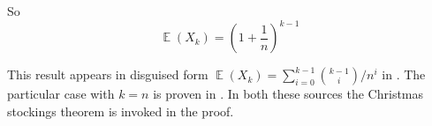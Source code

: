 \documentclass{article}
\DeclareMathOperator{\E}{\mathbb{E}}
\begin{document}
So 
\[
\E(X_k) = \left( 1 + \frac{1}{n} \right)^{k-1}
\]


This result appears in disguised form $\E(X_k) = \sum_{i=0}^{k-1} \binom{k-1}{i} / n^i$ in \cite{conroy2021collection}.
The particular case with $k=n$ is proven in \cite{trevino2020expected}.
In both these sources the Christmas stockings theorem is invoked in the proof. 










\end{document}
